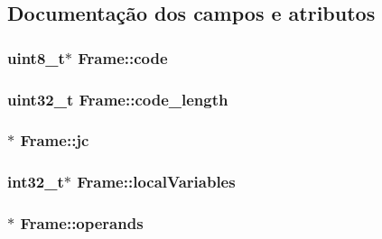 \subsection{Documentação dos campos e atributos}
\subsubsection[{\texorpdfstring{code}{code}}]{\setlength{\rightskip}{0pt plus 5cm}uint8\+\_\+t$\ast$ Frame\+::code}\hypertarget{structFrame_a9de8be272246d00c7a0c2ddc899fe8f2}{}\label{structFrame_a9de8be272246d00c7a0c2ddc899fe8f2}
\subsubsection[{\texorpdfstring{code\+\_\+length}{code_length}}]{\setlength{\rightskip}{0pt plus 5cm}uint32\+\_\+t Frame\+::code\+\_\+length}\hypertarget{structFrame_a33a0dd3a739e1dcfd8b03621c752bb28}{}\label{structFrame_a33a0dd3a739e1dcfd8b03621c752bb28}
\subsubsection[{\texorpdfstring{jc}{jc}}]{$\ast$ Frame\+::jc}\hypertarget{structFrame_a6a053c391bc6b65491e72d2fc8ef360f}{}\label{structFrame_a6a053c391bc6b65491e72d2fc8ef360f}
\subsubsection[{\texorpdfstring{local\+Variables}{localVariables}}]{\setlength{\rightskip}{0pt plus 5cm}int32\+\_\+t$\ast$ Frame\+::local\+Variables}\hypertarget{structFrame_a9047c9524d44fc81cb6311de8a2a8b77}{}\label{structFrame_a9047c9524d44fc81cb6311de8a2a8b77}
\subsubsection[{\texorpdfstring{operands}{operands}}]{$\ast$ Frame\+::operands}\hypertarget{structFrame_a0be587b8515083ff6d3c4e55918a7657}{}\label{structFrame_a0be587b8515083ff6d3c4e55918a7657}
